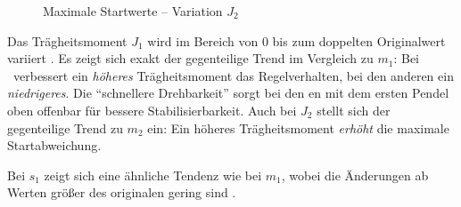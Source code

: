 \begin{figure}[p]
	\caption{Maximale Startwerte -- Variation $J_2$}
	\label{fig:sysvarJ2}
\end{figure}

Das Trägheitsmoment $J_1$ wird im Bereich von 0 bis zum doppelten Originalwert variiert .
Es zeigt sich exakt der gegenteilige Trend im Vergleich zu $m_1$: Bei \apz\ verbessert ein \emph{höheres} Trägheitsmoment das Regelverhalten, bei den anderen ein \emph{niedrigeres}.
Die "`schnellere Drehbarkeit"' sorgt bei den \ap en mit dem ersten Pendel oben offenbar für bessere Stabilisierbarkeit.
Auch bei $J_2$ stellt sich der gegenteilige Trend zu $m_2$ ein: Ein höheres Trägheitsmoment \emph{erhöht} die maximale Startabweichung.

Bei $s_1$ zeigt sich eine ähnliche Tendenz wie bei $m_1$, wobei die Änderungen ab Werten größer des originalen gering sind .

